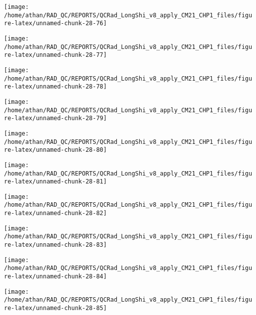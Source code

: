 \documentclass[
  10pt,
  a4paper,oneside]{article}
\begin{document}
\begin{center}\texttt{[image: /home/athan/RAD\_QC/REPORTS/QCRad\_LongShi\_v8\_apply\_CM21\_CHP1\_files/figure-latex/unnamed-chunk-28-76]} \end{center}

\begin{center}\texttt{[image: /home/athan/RAD\_QC/REPORTS/QCRad\_LongShi\_v8\_apply\_CM21\_CHP1\_files/figure-latex/unnamed-chunk-28-77]} \end{center}

\begin{center}\texttt{[image: /home/athan/RAD\_QC/REPORTS/QCRad\_LongShi\_v8\_apply\_CM21\_CHP1\_files/figure-latex/unnamed-chunk-28-78]} \end{center}

\begin{center}\texttt{[image: /home/athan/RAD\_QC/REPORTS/QCRad\_LongShi\_v8\_apply\_CM21\_CHP1\_files/figure-latex/unnamed-chunk-28-79]} \end{center}

\begin{center}\texttt{[image: /home/athan/RAD\_QC/REPORTS/QCRad\_LongShi\_v8\_apply\_CM21\_CHP1\_files/figure-latex/unnamed-chunk-28-80]} \end{center}

\begin{center}\texttt{[image: /home/athan/RAD\_QC/REPORTS/QCRad\_LongShi\_v8\_apply\_CM21\_CHP1\_files/figure-latex/unnamed-chunk-28-81]} \end{center}

\begin{center}\texttt{[image: /home/athan/RAD\_QC/REPORTS/QCRad\_LongShi\_v8\_apply\_CM21\_CHP1\_files/figure-latex/unnamed-chunk-28-82]} \end{center}

\begin{center}\texttt{[image: /home/athan/RAD\_QC/REPORTS/QCRad\_LongShi\_v8\_apply\_CM21\_CHP1\_files/figure-latex/unnamed-chunk-28-83]} \end{center}

\begin{center}\texttt{[image: /home/athan/RAD\_QC/REPORTS/QCRad\_LongShi\_v8\_apply\_CM21\_CHP1\_files/figure-latex/unnamed-chunk-28-84]} \end{center}

\begin{center}\texttt{[image: /home/athan/RAD\_QC/REPORTS/QCRad\_LongShi\_v8\_apply\_CM21\_CHP1\_files/figure-latex/unnamed-chunk-28-85]} \end{center}
\end{document}
